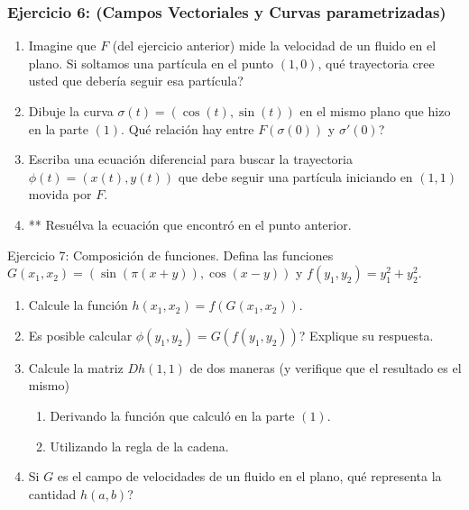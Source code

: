 \documentclass{beamer}
\begin{document}
\begin{frame}
\frametitle{Ejercicio 6: (Campos Vectoriales y Curvas parametrizadas)}
\begin{enumerate}
\item Imagine que $F$ (del ejercicio anterior) mide la velocidad de un fluido en el plano. Si soltamos una part\'icula en el punto $(1,0)$, qu\'e trayectoria cree usted que deber\'ia seguir esa part\'icula? 

\item Dibuje la curva $\sigma(t)=(\cos(t), \sin(t))$ en el mismo plano que hizo en la parte $(1)$. Qu\'e relaci\'on hay entre $F(\sigma(0))$ y $\sigma'(0)$?

\item Escriba una ecuaci\'on diferencial para buscar la trayectoria $\phi(t)=(x(t),y(t))$ que debe seguir una part\'icula iniciando en $(1,1)$ movida por $F$.

\item ** Resu\'elva la ecuaci\'on que encontr\'o en el punto anterior.
\end{enumerate}
\end{frame}

\begin{frame}{Ejercicio 7: Composici\'on de funciones.}
Defina las funciones $G(x_1,x_2)=\left(\sin(\pi(x+y)), \cos(x-y)\right)$ y 
$f(y_1,y_2)=y_1^2+y_2^2$.

\begin{enumerate}
\item Calcule la funci\'on $h(x_1,x_2)=f(G(x_1,x_2))$. 
\item Es posible calcular $\phi(y_1,y_2)= G(f(y_1,y_2))$? Explique su respuesta.

\item Calcule la matriz $Dh(1,1)$ de dos maneras (y verifique que el resultado es el mismo)
\begin{enumerate}
\item Derivando la funci\'on que calcul\'o en la parte $(1)$.
\item Utilizando la regla de la cadena.
\end{enumerate}
\item Si $G$ es el campo de velocidades de un fluido en el plano, qu\'e representa la cantidad $h(a,b)$?

\end{enumerate}

\end{frame}
\end{document}
